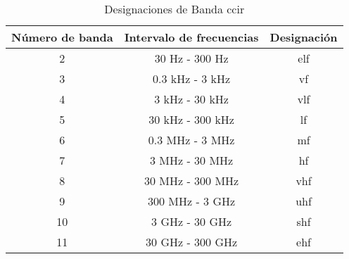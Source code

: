 \setcounter{table}{0}

\begin{table*}[h!]
    \centering
    \begin{tabular}{ccc}
        \hline
        Número de banda & Intervalo de frecuencias & Designación \\
        \hline
        2 & 30 Hz - 300 Hz & \gls{elf} \\
        3 & 0.3 kHz - 3 kHz & \gls{vf} \\
        4 & 3 kHz - 30 kHz & \gls{vlf} \\
        5 & 30 kHz - 300 kHz & \gls{lf} \\
        6 & 0.3 MHz - 3 MHz & \gls{mf} \\
        7 & 3 MHz - 30 MHz & \gls{hf} \\
        8 & 30 MHz - 300 MHz & \gls{vhf} \\
        9 & 300 MHz - 3 GHz & \gls{uhf} \\
        10 & 3 GHz - 30 GHz & \gls{shf} \\
        11 & 30 GHz - 300 GHz & \gls{ehf} \\
        \hline
    \end{tabular}
    \caption{Designaciones de Banda \gls{ccir}}
    \label{tab:ccir_bands}
\end{table*}